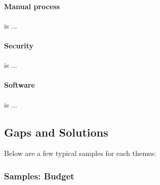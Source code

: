 \paragraph{Manual process} is ...

\paragraph{Security} is ...

\paragraph{Software} is ...

\subsection{Gaps and Solutions}



Below are a few typical samples for each themes:

\subsubsection{Samples: Budget}


